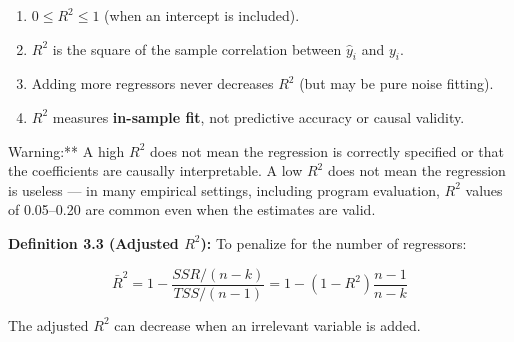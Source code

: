 \begin{enumerate}
\item $0 \leq R^2 \leq 1$ (when an intercept is included).
\item $R^2$ is the square of the sample correlation between $\hat{y}_i$ and $y_i$.
\item Adding more regressors never decreases $R^2$ (but may be pure noise fitting).
\item $R^2$ measures \textbf{in-sample fit}, not predictive accuracy or causal validity.
\end{enumerate}

\begin{keybox}{Warning:** A high $R^2$ does not mean the regression is correctly specified or that the coefficients are causally interpretable. A low $R^2$ does not mean the regression is useless --- in many empirical settings, including program evaluation, $R^2$ values of 0.05--0.20 are common even when the estimates are valid.}
\end{keybox}

\textbf{Definition 3.3 (Adjusted $R^2$):} To penalize for the number of regressors:

\[
\bar{R}^2 = 1 - \frac{SSR/(n-k)}{TSS/(n-1)} = 1 - (1 - R^2)\frac{n-1}{n-k}
\]

The adjusted $R^2$ can decrease when an irrelevant variable is added.

